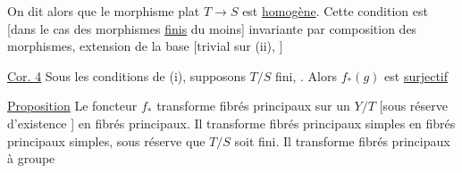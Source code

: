 On dit alors que le morphisme  plat $T\to S$ est \uline{homogène}.  Cette condition est [dans le cas des morphismes \uline{finis} du moins] invariante par composition des morphismes, extension de la base [trivial sur (ii), ]


\uline{Cor. 4} Sous les conditions de (i), supposons $T/S$ fini,  . Alors $f_*(g)$ est \uline{surjectif}

\uline{Proposition} Le foncteur $f_*$ transforme fibrés  principaux sur un $Y/T$ [sous réserve d'existence ] en fibrés  principaux.
Il transforme fibrés principaux simples en fibrés principaux simples, sous réserve que $T/S$ soit fini.
Il transforme  fibrés principaux à groupe    
